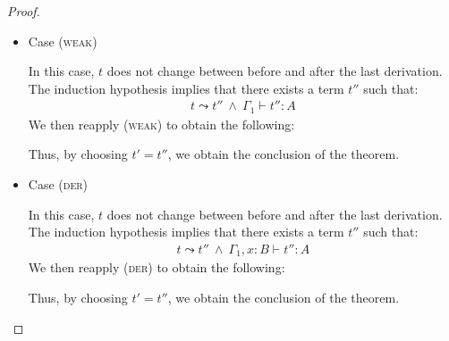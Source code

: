 \begin{proof}
\begin{itemize}
\item Case (\textsc{weak})
\begin{center}
    \begin{minipage}{.45\linewidth}
    \end{minipage}
\end{center}
In this case, $t$ does not change between before and after the last derivation.
The induction hypothesis implies that there exists a term $t''$ such that:
\begin{align*}
        t\leadsto t''
        \ \land\ \Gamma_1 \vdash t'' : A \tag{ih}
\end{align*}
We then reapply (\textsc{weak}) to obtain the following:
\begin{center}
    \begin{minipage}{.38\linewidth}
    \end{minipage}
\end{center}
Thus, by choosing $t'=t''$, we obtain the conclusion of the theorem.
\\

\item Case (\textsc{der})
\begin{center}
    \begin{minipage}{.45\linewidth}
    \end{minipage}
\end{center}
In this case, $t$ does not change between before and after the last derivation.
The induction hypothesis implies that there exists a term $t''$ such that:
\begin{align*}
        t\leadsto t''
        \ \land\ \Gamma_1, x:B \vdash t'' : A \tag{ih}
\end{align*}
We then reapply (\textsc{der}) to obtain the following:
\begin{center}
    \begin{minipage}{.38\linewidth}
    \end{minipage}
\end{center}
Thus, by choosing $t'=t''$, we obtain the conclusion of the theorem.
\\


\end{itemize}
\end{proof}
